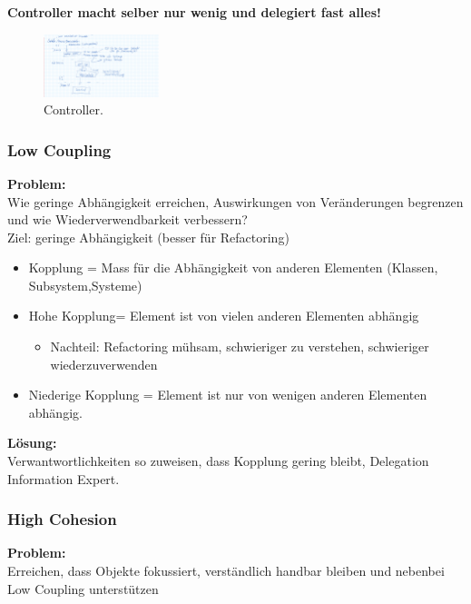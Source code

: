 \documentclass[../ZF_SWEN1.tex]{subfiles}
\begin{document}
\textbf{{\large Controller macht selber nur wenig und delegiert fast alles!}}

\begin{figure} [H]
\centering
\includegraphics[width=0.3\textwidth]{Resources/Images/Controller.png}
\caption{\label{fig:Controller}Controller.}

\end{figure}


\subsubsection{Low Coupling}
\textbf{Problem:\\}
Wie geringe Abhängigkeit erreichen, Auswirkungen von Veränderungen begrenzen und wie Wiederverwendbarkeit verbessern?\\
Ziel: geringe Abhängigkeit (besser für Refactoring)
\begin{itemize}
	\item Kopplung = Mass für die Abhängigkeit von anderen Elementen (Klassen, Subsystem,Systeme)
	\item Hohe Kopplung= Element ist von vielen anderen Elementen abhängig
	\begin{itemize}
		\item Nachteil: Refactoring mühsam, schwieriger zu verstehen, schwieriger wiederzuverwenden
		
	\end{itemize}
	\item Niederige Kopplung = Element ist nur von wenigen anderen Elementen abhängig.
\end{itemize}
\textbf{Lösung:\\}
Verwantwortlichkeiten so zuweisen, dass Kopplung gering bleibt, Delegation Information Expert.

\subsubsection{High Cohesion}
\textbf{Problem:\\}
Erreichen, dass Objekte fokussiert, verständlich handbar bleiben und nebenbei Low Coupling unterstützen
\end{document}
